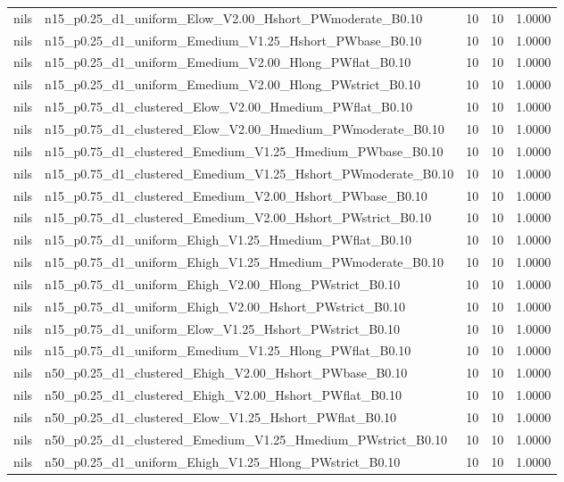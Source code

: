 \begin{tabular}{llrrr}
nils & n15_p0.25_d1_uniform_Elow_V2.00_Hshort_PWmoderate_B0.10 & 10 & 10 & 1.0000 \\
nils & n15_p0.25_d1_uniform_Emedium_V1.25_Hshort_PWbase_B0.10 & 10 & 10 & 1.0000 \\
nils & n15_p0.25_d1_uniform_Emedium_V2.00_Hlong_PWflat_B0.10 & 10 & 10 & 1.0000 \\
nils & n15_p0.25_d1_uniform_Emedium_V2.00_Hlong_PWstrict_B0.10 & 10 & 10 & 1.0000 \\
nils & n15_p0.75_d1_clustered_Elow_V2.00_Hmedium_PWflat_B0.10 & 10 & 10 & 1.0000 \\
nils & n15_p0.75_d1_clustered_Elow_V2.00_Hmedium_PWmoderate_B0.10 & 10 & 10 & 1.0000 \\
nils & n15_p0.75_d1_clustered_Emedium_V1.25_Hmedium_PWbase_B0.10 & 10 & 10 & 1.0000 \\
nils & n15_p0.75_d1_clustered_Emedium_V1.25_Hshort_PWmoderate_B0.10 & 10 & 10 & 1.0000 \\
nils & n15_p0.75_d1_clustered_Emedium_V2.00_Hshort_PWbase_B0.10 & 10 & 10 & 1.0000 \\
nils & n15_p0.75_d1_clustered_Emedium_V2.00_Hshort_PWstrict_B0.10 & 10 & 10 & 1.0000 \\
nils & n15_p0.75_d1_uniform_Ehigh_V1.25_Hmedium_PWflat_B0.10 & 10 & 10 & 1.0000 \\
nils & n15_p0.75_d1_uniform_Ehigh_V1.25_Hmedium_PWmoderate_B0.10 & 10 & 10 & 1.0000 \\
nils & n15_p0.75_d1_uniform_Ehigh_V2.00_Hlong_PWstrict_B0.10 & 10 & 10 & 1.0000 \\
nils & n15_p0.75_d1_uniform_Ehigh_V2.00_Hshort_PWstrict_B0.10 & 10 & 10 & 1.0000 \\
nils & n15_p0.75_d1_uniform_Elow_V1.25_Hshort_PWstrict_B0.10 & 10 & 10 & 1.0000 \\
nils & n15_p0.75_d1_uniform_Emedium_V1.25_Hlong_PWflat_B0.10 & 10 & 10 & 1.0000 \\
nils & n50_p0.25_d1_clustered_Ehigh_V2.00_Hshort_PWbase_B0.10 & 10 & 10 & 1.0000 \\
nils & n50_p0.25_d1_clustered_Ehigh_V2.00_Hshort_PWflat_B0.10 & 10 & 10 & 1.0000 \\
nils & n50_p0.25_d1_clustered_Elow_V1.25_Hshort_PWflat_B0.10 & 10 & 10 & 1.0000 \\
nils & n50_p0.25_d1_clustered_Emedium_V1.25_Hmedium_PWstrict_B0.10 & 10 & 10 & 1.0000 \\
nils & n50_p0.25_d1_uniform_Ehigh_V1.25_Hlong_PWstrict_B0.10 & 10 & 10 & 1.0000 \\

\end{tabular}
